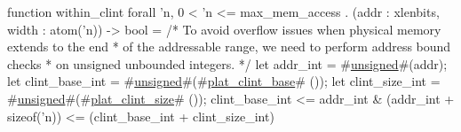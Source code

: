 function within_clint forall 'n, 0 < 'n <= max_mem_access . (addr : xlenbits, width : atom('n)) -> bool = {
  /* To avoid overflow issues when physical memory extends to the end
   * of the addressable range, we need to perform address bound checks
   * on unsigned unbounded integers.
   */
  let addr_int       = #\hyperref[sailRISCVzunsigned]{unsigned}#(addr);
  let clint_base_int = #\hyperref[sailRISCVzunsigned]{unsigned}#(#\hyperref[sailRISCVzplatzyclintzybase]{plat\_clint\_base}# ());
  let clint_size_int = #\hyperref[sailRISCVzunsigned]{unsigned}#(#\hyperref[sailRISCVzplatzyclintzysizze]{plat\_clint\_size}# ());
    clint_base_int <= addr_int
  & (addr_int + sizeof('n)) <= (clint_base_int + clint_size_int)
}
